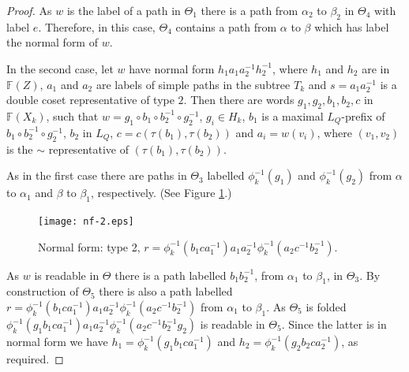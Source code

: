 \documentclass[a4paper,12pt]{article}
\renewcommand{\a}{\alpha }
\renewcommand{\b}{\beta }
\newcommand{\T}{\Theta }
\renewcommand{\t}{\tau }
\numberwithin{equation}{section}
\numberwithin{figure}{section}
\newcommand{\FF}{\ensuremath{\mathbb{F}}}
\begin{document}
\begin{proof}
As $w$ is the label of a path in $\T_1$ there is a path from $\a_2$ to
$\b_2$ in $\T_4$ with label $e$. Therefore, in this case, $\T_4$ contains
a path from $\a$ to $\b$ which has label the normal form of $w$.

In the second case,
let $w$ have normal form $h_1 a_1 a_2^{-1} h_2^{-1} $, where
$h_1$ and $h_2$ are in $\FF(Z)$,  $a_1$ and $a_2$ are labels
of simple paths in the subtree $T_k$ and $s=a_1a_2^{-1}$ is a double coset
representative of type $2$. Then there are words
$g_1, g_2, b_1, b_2, c$  in $\FF(X_k)$,  such that
$w=g_1\circ b_1 \circ b_2^{-1}\circ g_2^{-1}$,
$g_i\in H_k$, $b_1$ is a maximal $L_Q$-prefix of
$b_1 \circ b_2^{-1}\circ g_2^{-1}$, $b_2$ in
$L_Q$, $c=c(\t(b_1),\t(b_2))$ and $a_i=w(v_i)$, where
$(v_1,v_2)$ is the $\sim$ representative of $(\t(b_1),\t(b_2))$.



As in the first case there are paths in $\T_3$ labelled
$\phi_k^{-1}(g_1)$ and
$\phi_k^{-1}(g_2)$ from $\a$ to $\a_1$ and $\b$ to $\b_1$, respectively.
(See Figure \ref{fig:nf-2}.)
\begin{figure}
\begin{center}
\psfrag{a}{$\a$}
\psfrag{b}{$\b$}
\psfrag{a1}{$\a_1$}
\psfrag{a2}{$\a_2$}
\psfrag{b1}{$\b_1$}
\psfrag{b2}{$\b_2$}
\psfrag{Th5}{$\T_5$}
\texttt{[image: nf-2.eps]}
\end{center}
\caption{Normal form: type 2, $r=\phi_k^{-1}(b_1ca_1^{-1})a_1a_2^{-1}\phi_k^{-1}(a_2c^{-1}b_2^{-1})$.}
\label{fig:nf-2}
\end{figure}
As $w$ is readable in $\T$ there is a path labelled $b_1b_2^{-1}$, from
$\a_1$ to $\b_1$, in $\T_3$.
By construction of $\T_5$ there is also a path labelled
$r=\phi_k^{-1}(b_1ca_1^{-1})a_1a_2^{-1}\phi_k^{-1}(a_2c^{-1}b_2^{-1})$
from $\a_1$ to $\b_1$. As $\T_5$ is folded
$
\phi_k^{-1}(g_1 b_1ca_1^{-1})a_1a_2^{-1}\phi_k^{-1}(a_2c^{-1}b_2^{-1}g_2)$
 is readable in
$\T_5$. Since the latter is in normal form we have
$h_1 = \phi_k^{-1}(g_1 b_1ca_1^{-1})$ and
$h_2= \phi_k^{-1}(g_2 b_2ca_2^{-1})$, as required.
\end{proof}
\end{document}
